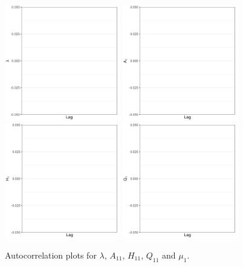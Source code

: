\begin{figure}[H]
    \centering
    \includegraphics[width=0.45\textwidth]{../figures/acf_lambda.png}
    \includegraphics[width=0.45\textwidth]{../figures/acf_A11.png}
    \includegraphics[width=0.45\textwidth]{../figures/acf_H11.png}
    \includegraphics[width=0.45\textwidth]{../figures/acf_Q11.png}
    
    \caption{Autocorrelation plots for $\lambda$, $A_{11}$, $H_{11}$, $Q_{11}$ and $\mu_1$.}
\end{figure}

